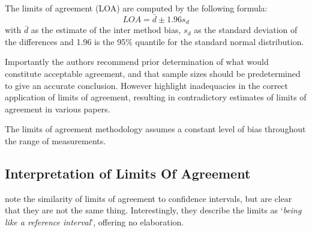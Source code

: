 \documentclass[12pt, a4paper]{report}
\theoremstyle{plain}
\theoremstyle{definition}
\theoremstyle{remark}
\begin{document}
The limits of agreement (LOA) are computed by the following
formula:
\[
LOA = \bar{d} \pm 1.96 s_{d}
\]
with $\bar{d}$ as the estimate of the inter method bias, $s_{d}$
as the standard deviation of the differences and 1.96 is the 95\%
quantile for the standard normal distribution. 

Importantly the authors recommend prior determination of what would constitute acceptable agreement, and that sample sizes should be predetermined to give an accurate conclusion. However \citet{mantha} highlight inadequacies in the correct application of limits of agreement, resulting in contradictory estimates of limits of agreement in various papers.

The limits of agreement methodology assumes a constant level of bias throughout the range of measurements. 






\subsection{Interpretation of Limits Of Agreement}

%


\citet{BA99} note the similarity of limits of agreement to
confidence intervals, but are clear that they are not the same thing. Interestingly, they describe the limits as `\textit{being like a reference interval}', offering no elaboration.
\end{document}
